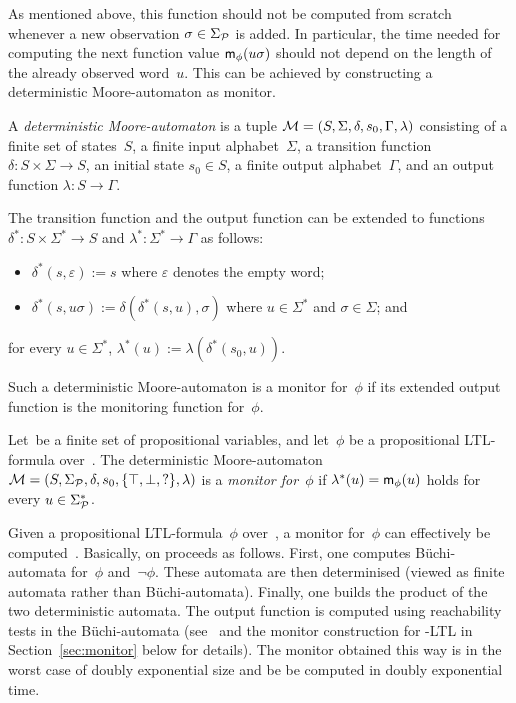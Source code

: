 \noindent
As mentioned above, this function should not be computed from scratch whenever a
new observation $\sigma\in\Sigma_\mathcal{P}$ is added.  In particular, the time needed
for computing the next function value $\mathsf{m}_\phi(u\sigma)$ should not depend on
the length of the already observed word~$u$.  This can be achieved by
constructing a deterministic Moore-automaton as monitor.

\begin{definition}
    A \emph{deterministic Moore-automaton} is a tuple
    $\mathcal{M}=(S,\Sigma,\delta,s_0,\Gamma,\lambda)$ consisting of a finite set of
    states~$S$, a finite input alphabet~$\Sigma$, a transition function
    $\delta\colon S\times\Sigma\to S$, an initial state $s_0\in S$, a finite
    output alphabet~$\Gamma$, and an output function $\lambda\colon S\to\Gamma$.

    The transition function and the output function can be extended to functions
    $\delta^*\colon S\times\Sigma^*\to S$ and $\lambda^*\colon\Sigma^*\to\Gamma$
    as follows:
    \begin{itemize}
        \item $\delta^*(s,\varepsilon):=s$ where $\varepsilon$ denotes the empty
            word;
        \item $\delta^*(s,u\sigma):=\delta(\delta^*(s,u),\sigma)$ where
            $u\in\Sigma^*$ and $\sigma\in\Sigma$; and
    \end{itemize}
    for every $u\in\Sigma^*$, $\lambda^*(u):=\lambda(\delta^*(s_0,u))$.
\end{definition}

\noindent
Such a deterministic Moore-automaton is a monitor for~$\phi$ if its extended
output function is the monitoring function for~$\phi$.

\begin{definition}
    Let~\Pmc be a finite set of propositional variables, and let~$\phi$ be a
    propositional LTL-formula over~\Pmc.
    The deterministic Moore-automaton
    $\mathcal{M}=(S,\Sigma_\mathcal{P},\delta,s_0,\{\top,\bot,{?}\},\lambda)$
    is a \emph{monitor for~$\phi$} if $\lambda^*(u)=\mathsf{m}_\phi(u)$ holds for
    every $u\in\Sigma_\mathcal{P}^*$.
\end{definition}

\noindent
Given a propositional LTL-formula~$\phi$ over~\Pmc, a monitor for~$\phi$ can
effectively be computed~\cite{BaLS-ToSEM11}.  Basically, on proceeds as follows.
First, one computes Büchi-automata for~$\phi$ and~$\lnot\phi$.  These automata
are then determinised (viewed as finite automata rather than Büchi-automata).
Finally, one builds the product of the two deterministic automata.  The output
function is computed using reachability tests in the Büchi-automata
(see~\cite{BaLS-ToSEM11} and the monitor construction for \SHOQ-LTL in
Section~\ref{sec:monitor} below for details).  The monitor obtained this way is
in the worst case of doubly exponential size and be be computed in doubly
exponential time.

